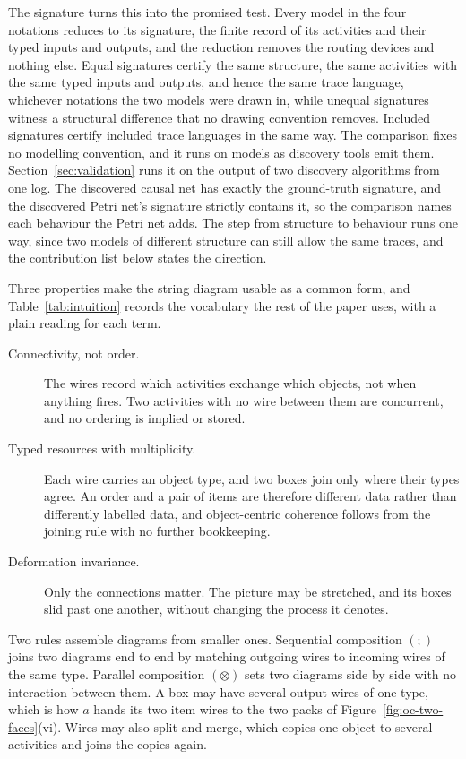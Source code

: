 The signature turns this into the promised test. Every model in the four notations reduces to its
signature, the finite record of its activities and their typed inputs and outputs, and the
reduction removes the routing devices and nothing else. Equal signatures certify the same
structure, the same activities with the same typed inputs and outputs, and hence the same trace language,
whichever notations the two models were drawn in, while unequal signatures witness a structural
difference that no drawing convention removes. Included signatures certify included trace
languages in the same way. The comparison fixes no modelling convention, and
it runs on models as discovery tools emit them. Section~\ref{sec:validation} runs it on the output
of two discovery algorithms from one log. The discovered causal net has exactly the ground-truth
signature, and the discovered Petri net's signature strictly contains it, so the comparison names
each behaviour the Petri net adds. The step from structure to behaviour runs one way, since two models of different
structure can still allow the same traces, and the contribution list below states the direction.

Three properties make the string diagram usable as a common form, and
Table~\ref{tab:intuition} records the vocabulary the rest of the paper uses, with a plain reading
for each term.

\begin{description}
  \item[Connectivity, not order.] The wires record which activities exchange which objects, not
    when anything fires. Two activities with no wire between them are concurrent, and no ordering
    is implied or stored.
  \item[Typed resources with multiplicity.] Each wire carries an object type, and two boxes join
    only where their types agree. An order and a pair of items are therefore different data rather
    than differently labelled data, and object-centric coherence follows from the joining rule with
    no further bookkeeping.
  \item[Deformation invariance.] Only the connections matter. The picture may be stretched, and its
    boxes slid past one another, without changing the process it denotes.
\end{description}

Two rules assemble diagrams from smaller ones. Sequential composition $(;)$ joins two diagrams end
to end by matching outgoing wires to incoming wires of the same type. Parallel composition
$(\otimes)$ sets two diagrams side by side with no interaction between them. A box may have several
output wires of one type, which is how $a$ hands its two $\mathrm{item}$ wires to the two packs of
Figure~\ref{fig:oc-two-faces}(vi). Wires may also split and merge, which copies one object to
several activities and joins the copies again.

